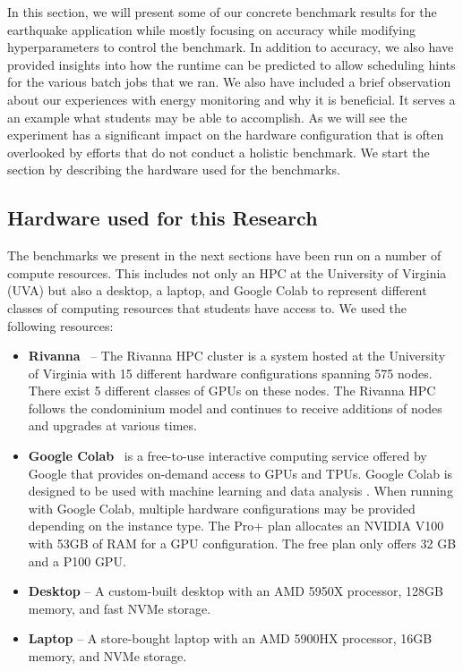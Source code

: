 \documentclass[utf8]{FrontiersinVancouver} %
\begin{document}
In this section, we will present some of our concrete benchmark results for the earthquake application while mostly focusing on accuracy while modifying hyperparameters to control the benchmark. In addition to accuracy, we also have provided insights into how the runtime can be predicted to allow scheduling hints for the various batch jobs that we ran. We also have included a brief observation about our experiences with energy monitoring and why it is beneficial. 
It serves a an example what students may be able to accomplish. As we will see the experiment has a significant impact on the hardware configuration that is often overlooked by efforts that do not conduct a holistic benchmark.
We start the section by describing the hardware used for the benchmarks.


\subsection{Hardware used for this Research}

The benchmarks we present in the next sections have been run on a number of compute resources. This includes not only an HPC at the University of Virginia (UVA) but also a desktop, a laptop, and Google Colab to represent different classes of computing resources that students have access to. We used the following resources:

\begin{itemize}
\item {\bf Rivanna}~\citep{www-rivanna} -- The Rivanna HPC cluster is  a system hosted at the University of Virginia with 15 different  hardware configurations spanning 575 nodes.  There exist 5 different  classes of GPUs on these nodes. The Rivanna HPC follows the  condominium model and continues to receive additions of nodes and  upgrades at various times.
\item {\bf Google Colab}~\cite{google-colab} is a free-to-use interactive computing service offered by Google that provides on-demand access to GPUs and TPUs. Google Colab is designed to be used with machine learning and data analysis \cite{google-colab}. When running with Google Colab, multiple hardware configurations may be provided depending on the instance type. The Pro+ plan allocates an NVIDIA V100 with 53GB of RAM for a GPU configuration. The free  plan only offers 32 GB and a P100 GPU.
\item {\bf Desktop} -- A custom-built desktop with an AMD 5950X processor, 128GB memory, and fast NVMe storage.
\item {\bf Laptop} -- A store-bought laptop with an AMD 5900HX processor, 16GB memory, and NVMe storage.

\end{itemize}
\end{document}
